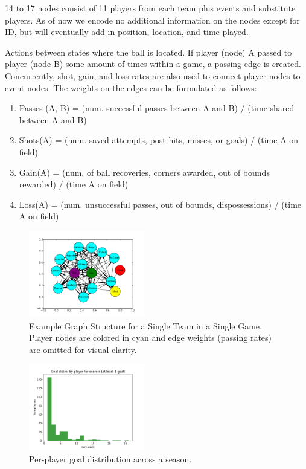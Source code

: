  14 to 17 nodes consist of 11 players from each team plus events and substitute players. As of now we encode no additional information on the nodes except for ID, but will eventually add in position, location, and time played. 

 Actions between states where the ball is located. If player (node) A passed to player (node B) some amount of times within a game, a passing edge is created. Concurrently, shot, gain, and loss rates are also used to connect player nodes to event nodes. The weights on the edges can be formulated as follows: 

\begin{enumerate}

    \item Passes (A, B) = (num. successful passes between A and B) / (time shared between A and B)

    \item Shots(A) = (num. saved attempts, post hits, misses, or goals) / (time A on field) 

    \item Gain(A) = (num. of ball recoveries, corners awarded, out of bounds rewarded) / (time A on field) 

    \item Loss(A) = (num. unsuccessful passes, out of bounds, dispossessions) / (time A on field) 

\end{enumerate}


\begin{figure}[h]
  \centering
  \includegraphics[width=0.45\textwidth]{plots/soccer_networkx.pdf}
  \caption{Example Graph Structure for a Single Team in a Single Game. Player nodes are colored in cyan and edge weights (passing rates) are omitted for visual clarity.}
\end{figure}


\begin{figure}[h]
  \centering
  \includegraphics[width=0.45\textwidth]{plots/eplper_player_goal_hist.pdf}
  \caption{Per-player goal distribution across a season.}
\end{figure}



